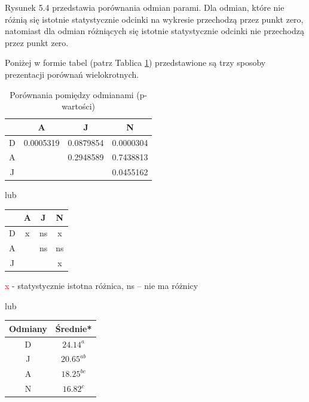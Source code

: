 \documentclass[12pt,B5paper,]{book}
\begin{document}
Rysunek 5.4 przedstawia porównania odmian parami. Dla odmian, które nie
różnią się istotnie statystycznie odcinki na wykresie przechodzą przez
punkt zero, natomiast dla odmian różniących się istotnie statystycznie
odcinki nie przechodzą przez punkt zero.

Poniżej w formie tabel (patrz Tablica \ref{pwartosci}) przedstawione są
trzy sposoby prezentacji porównań wielokrotnych.

\begin{table}[H]
\centering
\caption{Porównania pomiędzy odmianami (p-wartości)}
\label{pwartosci}
\begin{tabular}{cccc}
  & A                                & J         & N                                \\ \hline
D & {\color[HTML]{FE0000} 0.0005319} & 0.0879854 & {\color[HTML]{FE0000} 0.0000304} \\
A &                                  & 0.2948589 & 0.7438813                        \\
J &                                  &           & {\color[HTML]{FE0000} 0.0455162} \\ \hline
\end{tabular}
\end{table}

lub

\begin{table}[H]
\centering
\begin{tabular}{cccc}
  & A                                & J         & N                                \\ \hline
D & {\color[HTML]{FE0000} x} & ns & {\color[HTML]{FE0000} x} \\
A &                                  & ns & ns                        \\
J &                                  &           & {\color[HTML]{FE0000} x} \\ \hline
\end{tabular}
\end{table}

\textcolor{red}{x} - statystycznie istotna różnica, ns -- nie ma różnicy

lub

\begin{table}[H]
\centering
\begin{tabular}{cc}
Odmiany & Średnie* \\ \hline
D       & $24.14^a$  \\
J       & $20.65^{ab}$  \\
A       & $18.25^{bc}$  \\
N       & $16.82^c$   \\ \hline
\end{tabular}
\end{table}
\end{document}
